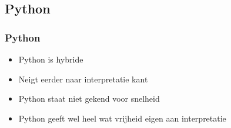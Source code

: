 \subsection{Python}

\frame{\tableofcontents[currentsubsection]}

\begin{frame}
  \frametitle{Python}
  \begin{itemize}
    \item Python is hybride
    \item Neigt eerder naar interpretatie kant
    \item Python staat niet gekend voor snelheid
    \item Python geeft wel heel wat vrijheid eigen aan interpretatie
  \end{itemize}
\end{frame}


